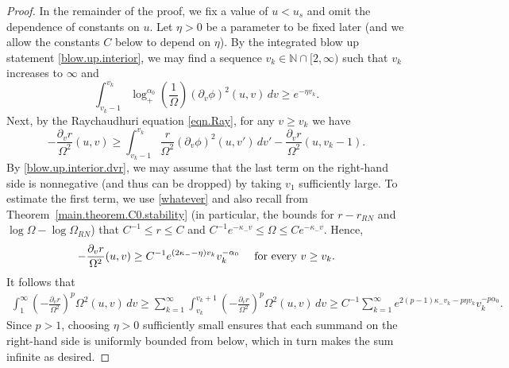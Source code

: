 \documentclass[10pt, reqno]{amsart}
\theoremstyle{definition}
\theoremstyle{remark}
\numberwithin{equation}{section}
\newcommand{\rd}{\partial}
\newcommand{\0}{\emptyset}
\newcommand{\alp}{\alpha}
\newcommand{\kpp}{\kappa}
\newcommand{\Omg}{\Omega}
\newcommand{\bbN}{\mathbb N}
\begin{document}
\begin{proof}
In the remainder of the proof, we fix a value of $u < u_{s}$ and omit the dependence of constants on $u$. Let $\eta > 0$ be a parameter to be fixed later (and we allow the constants $C$ below to depend on $\eta$). By the integrated blow up statement \eqref{blow.up.interior}, we may find a sequence $v_{k} \in \bbN \cap [2, \infty)$ such that $v_{k}$ increases to $\infty$ and
\begin{equation}\label{whatever}
	\int_{v_{k}-1}^{v_{k}} \log_{+}^{\alp_{0}} (\frac{1}{\Omg}) (\rd_{v} \phi)^{2} (u, v) \, d v \geq e^{- \eta v_{k}}.
\end{equation}
Next, by the Raychaudhuri equation \eqref{eqn.Ray}, for any $v \geq v_{k}$ we have
\begin{equation*}
	- \frac{\rd_{v} r}{\Omg^{2}}(u, v) \geq \int_{v_{k}-1}^{v_{k}} \frac{r}{\Omg^{2}} (\rd_{v} \phi)^{2} (u, v') \, d v' - \frac{\rd_{v} r}{\Omg^{2}}(u, v_{k}-1).
\end{equation*}
By \eqref{blow.up.interior.dvr}, we may assume that the last term on the right-hand side is nonnegative (and thus can be dropped) by taking $v_{1}$ sufficiently large. To estimate the first term, we use \eqref{whatever} and also recall from Theorem~\ref{main.theorem.C0.stability} (in particular, the bounds for $r - r_{RN}$ and $\log \Omg - \log \Omg_{RN}$) that $C^{-1} \leq r \leq C$ and $C^{-1} e^{-  \kpp_{-} v} \leq \Omg \leq C e^{-  \kpp_{-} v}$. Hence,
\begin{equation*}
- \frac{\rd_{v} r}{\Omg^{2}}(u, v) \geq C^{-1} e^{(2 \kpp_{-} - \eta) v_{k}} v_{k}^{-\alp_{0}} \quad \hbox{ for every } v \geq v_{k}.
\end{equation*}
It follows that
\begin{align*}
\int_{1}^{\infty} \left(-\frac{\rd_{v} r}{\Omg^{2}}\right)^{p} \Omg^{2} (u, v) \, d v
\geq \sum_{k =1}^{\infty} \int_{v_{k}}^{v_{k}+1} \left(-\frac{\rd_{v} r}{\Omg^{2}}\right)^{p} \Omg^{2} (u, v) \, d v
\geq C^{-1} \sum_{k =1}^{\infty} e^{2 (p-1) \kpp_{-} v_{k} - p \eta v_{k}} v_{k}^{-p \alp_{0}}.
\end{align*}
Since $p > 1$, choosing $\eta > 0$ sufficiently small ensures that each summand on the right-hand side is uniformly bounded from below, which in turn makes the sum infinite as desired. \qedhere
\end{proof}



\end{document}
